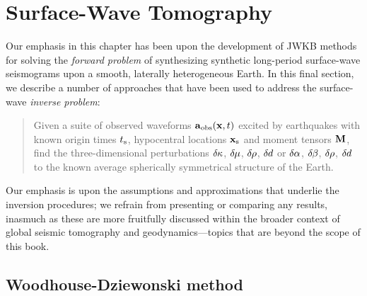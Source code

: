 \section{Surface-Wave Tomography}
%
%
\label{16.sec.eqrot}

Our emphasis in this chapter has been upon the development
of JWKB methods for solving the {\em forward problem\/} of
%
synthesizing synthetic long-period surface-wave seismograms
upon a smooth, laterally heterogeneous Earth.  In this final
section, we describe a number of approaches that have been
used to address the surface-wave {\em inverse problem\/}:
%
\begin{quote}
Given a suite of observed waveforms $\mbox{${\bf a}$}_{\rm obs}(\mbox{${\bf x}$},t)$
excited by earthquakes with known origin times $t_{\rm s}$,
hypocentral locations $\mbox{${\bf x}$}_{\rm s}$ and moment tensors $\mbox{${\bf M}$}$,
find the three-dimensional perturbations
$\delta\hspace{-0.1 mm}\kappa$, $\delta\hspace{-0.2 mm}\mu$,
$\delta\hspace{-0.2 mm}\rho$, $\delta\hspace{-0.1 mm}d$
or $\delta\hspace{-0.1 mm}\alpha$,
$\delta\hspace{-0.2 mm}\beta$, $\delta\hspace{-0.1 mm}\rho$,
$\delta\hspace{-0.1 mm}d$ to the known average
spherically symmetrical structure of the Earth.
\end{quote}
Our emphasis is upon the assumptions and approximations
that underlie the inversion procedures; we refrain from
presenting or comparing any results, inasmuch as these are
more fruitfully discussed within the broader context of global
seismic tomography and geodynamics---topics that are beyond
the scope of this book.

\subsection{Woodhouse-Dziewonski method}
%

